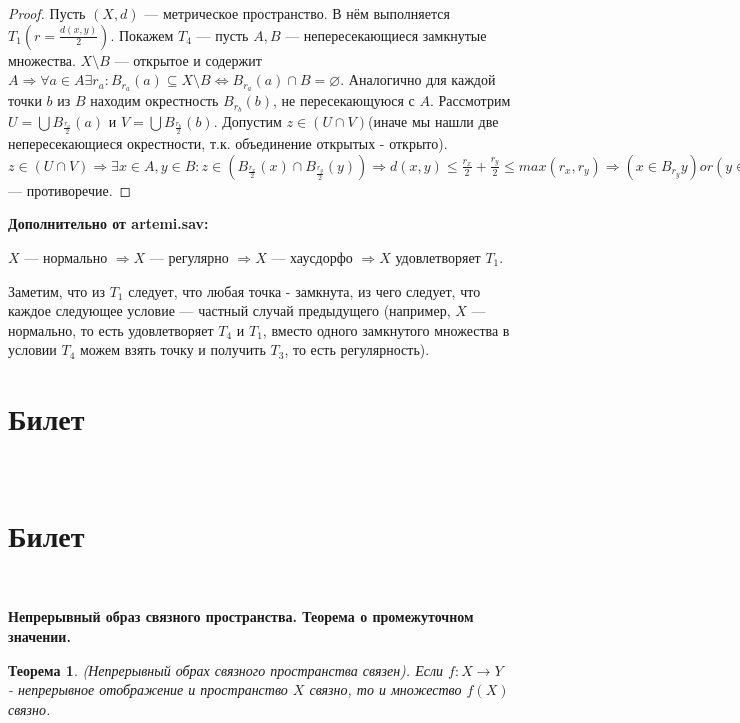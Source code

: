 \documentclass[a4paper,100pt]{article}
\theoremstyle{indented}
\newtheorem{theorem}{Теорема}
\begin{document}
    \begin{proof}
        Пусть $(X,d)$ --- метрическое пространство. В нём выполняется $T_1(r = \frac{d(x,y)}{2})$. Покажем $T_4$ --- пусть $A,B$ --- непересекающиеся замкнутые множества. $X \setminus B$ --- открытое и содержит $A \Rightarrow \forall a \in A \exists r_a: B_{r_a}(a) \subseteq X \setminus B \iff B_{r_a}(a) \cap B = \varnothing$. Аналогично для каждой точки $b$ из $B$ находим окрестность $B_{r_b}(b)$, не пересекающуюся с $A$. Рассмотрим $U = \bigcup B_{\frac{r_a}{2}}(a)$  и $V = \bigcup B_{\frac{r_b}2}(b)$. Допустим $z \in (U \cap V)$(иначе мы нашли две непересекающиеся окрестности, т.к. объединение открытых - открыто). $z \in (U \cap V) \Rightarrow \exists x \in A, y \in B: z \in (B_{\frac{r_x}2}(x) \cap B_{\frac{r_y}2}(y)) \Rightarrow d(x,y) \leq \frac{r_x}2 + \frac{r_y}2 \leq max(r_x,r_y) \Rightarrow (x\in B_{r_y}y) or (y \in B_{r_x}(x))$--- противоречие. 
    \end{proof}
    
    \textbf{Дополнительно от artemi.sav:}
    
    $X$ --- нормально $\Rightarrow X$ --- регулярно $\Rightarrow X$ --- хаусдорфо $\Rightarrow X$ удовлетворяет $T_1$.
    
    Заметим, что из $T_1$ следует, что любая точка - замкнута, из чего следует, что каждое следующее условие ---  частный случай предыдущего (например, $X$ --- нормально, то есть удовлетворяет $T_4$ и $T_1$, вместо одного замкнутого множества в условии $T_4$ можем взять точку и получить $T_3$, то есть регулярность).


\section{Билет} \

\medskip

\section{Билет} \

\medskip

\textbf{Непрерывный образ связного пространства. Теорема о промежуточном значении.}\\

\begin{theorem}
    (Непрерывный обрах связного пространства связен). Если $f: X\rightarrow Y$ - непрерывное отображение и пространство $X$ связно, то и множество $f(X)$ связно.
\end{theorem}
\end{document}
